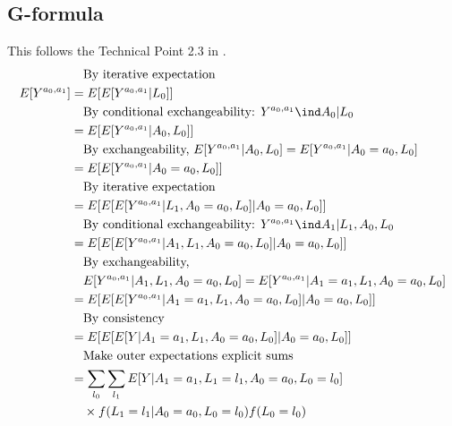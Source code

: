 \documentclass[dvipdfmx,10pt]{article}
\begin{document}
\subsection{G-formula}
\label{sec:org1f416cd}
This follows the Technical Point 2.3 in \cite{hernanCausalInference2019}.
\begin{align*}
  &~~~\text{By iterative expectation}\\
  E[Y^{a_{0},a_{1}}]
  &= E[E[Y^{a_{0},a_{1}} | L_{0}]]\\
  &~~~\text{By conditional exchangeability: } Y^{a_{0},a_{1}} \ind A_{0} | L_{0}\\
  &= E[E[Y^{a_{0},a_{1}} | A_{0}, L_{0}]]\\
  &~~~\text{By exchangeability, }E[Y^{a_{0},a_{1}} | A_{0}, L_{0}] = E[Y^{a_{0},a_{1}} | A_{0} = a_{0}, L_{0}]\\
  &= E[E[Y^{a_{0},a_{1}} | A_{0} = a_{0}, L_{0}]]\\
  &~~~\text{By iterative expectation}\\
  &= E[E[ E[Y^{a_{0},a_{1}} | L_{1}, A_{0} = a_{0}, L_{0}] | A_{0} = a_{0}, L_{0}]]\\
  &~~~\text{By conditional exchangeability: } Y^{a_{0},a_{1}} \ind A_{1} | L_{1},A_{0},L_{0}\\
  &= E[E[ E[Y^{a_{0},a_{1}} | A_{1}, L_{1}, A_{0} = a_{0}, L_{0}] | A_{0} = a_{0}, L_{0}]]\\
  &~~~\text{By exchangeability, }\\
  &~~~E[Y^{a_{0},a_{1}} | A_{1}, L_{1}, A_{0} = a_{0}, L_{0}] = E[Y^{a_{0},a_{1}} | A_{1} = a_{1}, L_{1}, A_{0} = a_{0}, L_{0}]\\
  &= E[E[ E[Y^{a_{0},a_{1}} | A_{1} = a_{1}, L_{1}, A_{0} = a_{0}, L_{0}] | A_{0} = a_{0}, L_{0}]]\\
  &~~~\text{By consistency}\\
  &= E[E[ E[Y | A_{1} = a_{1}, L_{1}, A_{0} = a_{0}, L_{0}] | A_{0} = a_{0}, L_{0}]]\\
  &~~~\text{Make outer expectations explicit sums}\\
  &= \sum_{l_{0}} \sum_{l_{1}}
    E[Y | A_{1} = a_{1}, L_{1} = l_{1}, A_{0} = a_{0}, L_{0} = l_{0}]\\
  &~~~\times f(L_{1} = l_{1} | A_{0} = a_{0}, L_{0} = l_{0}) f(L_{0} = l_{0})\\
\end{align*}
\end{document}

